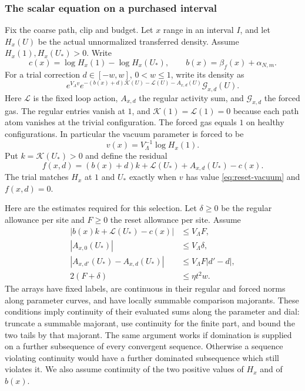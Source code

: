 \subsubsection{The scalar equation on a purchased interval}
Fix the coarse path, clip and budget. Let $x$ range in an interval $I$,
and let $H_x(U)$ be the actual unnormalized transferred density. Assume
$H_x(1),H_x(U_*)>0$. Write
\[
 c(x)=\log H_x(1)-\log H_x(U_*),\qquad
 b(x)=\beta_f(x)+\alpha_{N,m}.
\]
For a trial correction $d\in[-w,w]$, $0<w\le1$, write its density as
\begin{equation}\label{eq:reset-trial-density}
 e^{V_\Lambda v}
 e^{-(b(x)+d)\mathcal K(U)-\mathcal L(U)-A_{x,d}(U)}
                         \mathcal G_{x,d}(U).
\end{equation}
Here $\mathcal L$ is the fixed loop action, $A_{x,d}$ the regular
activity sum, and $\mathcal G_{x,d}$ the forced gas. The regular
entries vanish at $1$, and $\mathcal K(1)=\mathcal L(1)=0$ because
each path atom vanishes at the trivial configuration. The forced gas
equals $1$ on healthy
configurations. In particular the vacuum parameter is forced to be
\begin{equation}\label{eq:reset-vacuum}
                    v(x)=V_\Lambda^{-1}\log H_x(1).
\end{equation}
Put $k=\mathcal K(U_*)>0$ and define the residual
\[
 f(x,d)=(b(x)+d)k+\mathcal L(U_*)+A_{x,d}(U_*)-c(x).
\]
The trial matches $H_x$ at $1$ and $U_*$ exactly when $v$ has
value \eqref{eq:reset-vacuum} and $f(x,d)=0$.

Here are the estimates required for this selection. Let
$\delta\ge0$ be the regular allowance per site and $F\ge0$ the
reset allowance per site. Assume
\begin{align}
 |b(x)k+\mathcal L(U_*)-c(x)|&\le V_\Lambda F,
                                      \label{eq:reset-surplus}\\
 |A_{x,0}(U_*)|&\le V_\Lambda\delta,\nonumber\\
 |A_{x,d'}(U_*)-A_{x,d}(U_*)|
              &\le V_\Lambda F|d'-d|,\nonumber\\
 2(F+\delta)&\le\eta t^2w.\label{eq:reset-purchase}
\end{align}
The arrays have fixed labels, are continuous in their regular and forced
norms along parameter curves, and have locally summable comparison
majorants. These conditions imply continuity of their evaluated sums
along the parameter and dial: truncate a summable majorant, use
continuity for the finite part, and bound the two tails by that majorant.
The same argument works if domination is supplied on a further
subsequence of every convergent sequence. Otherwise a sequence
violating continuity would have a further dominated subsequence which
still violates it. We also assume continuity of the two positive
values of $H_x$ and of $b(x)$.

